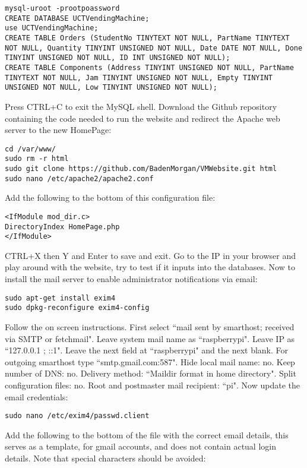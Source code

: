 \documentclass[a4paper,11pt]{article}
\numberwithin{figure}{section}
\numberwithin{table}{section}
\begin{document}
\begin{appendices}
\begin{lstlisting}[firstnumber=11]
mysql-uroot -prootpoassword
CREATE DATABASE UCTVendingMachine;
use UCTVendingMachine;
CREATE TABLE Orders (StudentNo TINYTEXT NOT NULL, PartName TINYTEXT NOT NULL, Quantity TINYINT UNSIGNED NOT NULL, Date DATE NOT NULL, Done TINYINT UNSIGNED NOT NULL, ID INT UNSIGNED NOT NULL);
CREATE TABLE Components (Address TINYINT UNSIGNED NOT NULL, PartName TINYTEXT NOT NULL, Jam TINYINT UNSIGNED NOT NULL, Empty TINYINT UNSIGNED NOT NULL, Low TINYINT UNSIGNED NOT NULL);
\end{lstlisting}
Press CTRL+C to exit the MySQL shell. Download the Github repository containing the code needed to run the website and redirect the Apache web server to the new HomePage:
\begin{lstlisting}[firstnumber=16]
cd /var/www/
sudo rm -r html
sudo git clone https://github.com/BadenMorgan/VMWebsite.git html
sudo nano /etc/apache2/apache2.conf
\end{lstlisting}
Add the following to the bottom of this configuration file:
\begin{lstlisting}[firstnumber=20]
<IfModule mod_dir.c>
DirectoryIndex HomePage.php
</IfModule>
\end{lstlisting}
CTRL+X then Y and Enter to save and exit. Go to the IP in your browser and play around with the website, try to test if it inputs into the databases. Now to install the mail server to enable administrator notifications via email:
\begin{lstlisting}[firstnumber=23]
sudo apt-get install exim4
sudo dpkg-reconfigure exim4-config
\end{lstlisting}
Follow the on screen instructions. First select ``mail sent by smarthost; received via SMTP or fetchmail". Leave system mail name as ``raspberrypi". Leave IP as ``127.0.0.1 ; ::1". Leave the next field at ``raspberrypi" and the next blank. For outgoing smarthost type ``smtp.gmail.com:587". Hide local mail name: no. Keep number of DNS: no. Delivery method: ``Maildir format in home directory". Split configuration files: no. Root and postmaster mail recipient: ``pi". Now update the email credentials:
\begin{lstlisting}[firstnumber=25]
sudo nano /etc/exim4/passwd.client
\end{lstlisting}
Add the following to the bottom of the file with the correct email details, this serves as a template, for gmail accounts, and does not contain actual login details. Note that special characters should be avoided:
\begin{lstlisting}[firstnumber=26]

\end{lstlisting}
\end{appendices}
\end{document}
